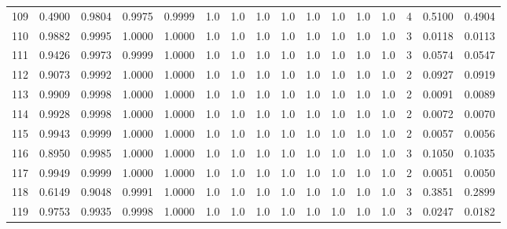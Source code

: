 \begin{tabular}{lrrrrrrrrrrrrrrr}
109 &      0.4900 &  0.9804 &  0.9975 &  0.9999 &     1.0 &     1.0 &     1.0 &     1.0 &     1.0 &     1.0 &      1.0 &        1.0 &      4 &                    0.5100 &                     0.4904 \\
110 &      0.9882 &  0.9995 &  1.0000 &  1.0000 &     1.0 &     1.0 &     1.0 &     1.0 &     1.0 &     1.0 &      1.0 &        1.0 &      3 &                    0.0118 &                     0.0113 \\
111 &      0.9426 &  0.9973 &  0.9999 &  1.0000 &     1.0 &     1.0 &     1.0 &     1.0 &     1.0 &     1.0 &      1.0 &        1.0 &      3 &                    0.0574 &                     0.0547 \\
112 &      0.9073 &  0.9992 &  1.0000 &  1.0000 &     1.0 &     1.0 &     1.0 &     1.0 &     1.0 &     1.0 &      1.0 &        1.0 &      2 &                    0.0927 &                     0.0919 \\
113 &      0.9909 &  0.9998 &  1.0000 &  1.0000 &     1.0 &     1.0 &     1.0 &     1.0 &     1.0 &     1.0 &      1.0 &        1.0 &      2 &                    0.0091 &                     0.0089 \\
114 &      0.9928 &  0.9998 &  1.0000 &  1.0000 &     1.0 &     1.0 &     1.0 &     1.0 &     1.0 &     1.0 &      1.0 &        1.0 &      2 &                    0.0072 &                     0.0070 \\
115 &      0.9943 &  0.9999 &  1.0000 &  1.0000 &     1.0 &     1.0 &     1.0 &     1.0 &     1.0 &     1.0 &      1.0 &        1.0 &      2 &                    0.0057 &                     0.0056 \\
116 &      0.8950 &  0.9985 &  1.0000 &  1.0000 &     1.0 &     1.0 &     1.0 &     1.0 &     1.0 &     1.0 &      1.0 &        1.0 &      3 &                    0.1050 &                     0.1035 \\
117 &      0.9949 &  0.9999 &  1.0000 &  1.0000 &     1.0 &     1.0 &     1.0 &     1.0 &     1.0 &     1.0 &      1.0 &        1.0 &      2 &                    0.0051 &                     0.0050 \\
118 &      0.6149 &  0.9048 &  0.9991 &  1.0000 &     1.0 &     1.0 &     1.0 &     1.0 &     1.0 &     1.0 &      1.0 &        1.0 &      3 &                    0.3851 &                     0.2899 \\
119 &      0.9753 &  0.9935 &  0.9998 &  1.0000 &     1.0 &     1.0 &     1.0 &     1.0 &     1.0 &     1.0 &      1.0 &        1.0 &      3 &                    0.0247 &                     0.0182 \\

\end{tabular}
